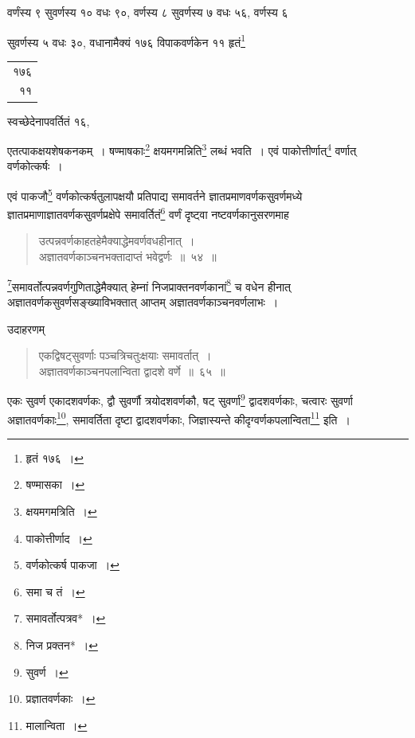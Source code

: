 \documentclass[10pt, openany]{book}
\begin{document}
{{{वर्णंस्य ९ सुवर्णस्य १० वधः ९०, वर्णस्य ८ सुवर्णस्य ७ वधः ५६, वर्णस्य
६}
{सुवर्णस्य ५ वधः ३०, वधानामैक्यं १७६ विपाकवर्णकेन ११ हृतं\renewcommand{\thefootnote}{\s १}\footnote{\s हृतं १७६~।}\begin{tabular}{r}१७६\\ ११\end{tabular}स्वच्छेदेनापवर्तितं १६,}
{एतत्पाकक्षयशेषकनकम्~। षण्माषकाः\renewcommand{\thefootnote}{\s २}\footnote{\s षण्मासका~।}  क्षयमगमन्निति\renewcommand{\thefootnote}{\s ३}\footnote{\s क्षयमगमत्रिति~।}  लब्धं भवति~।
एवं पाकोत्तीर्णात्\renewcommand{\thefootnote}{\s ४}\footnote{\s पाकोत्तीर्णाद~।} वर्णात् वर्णकोत्कर्षः~।}
\vspace{-1mm}

{एवं पाकजौ\renewcommand{\thefootnote}{\s ५}\footnote{\s  वर्णकोत्कर्ष पाकजा~।}  वर्णकोत्कर्षतुलापक्षयौ प्रतिपाद्य समावर्तने
ज्ञातप्रमाणवर्णकसुवर्णमध्ये}
{ज्ञातप्रमाणाज्ञातवर्णकसुवर्णप्रक्षेपे समावर्तितं\renewcommand{\thefootnote}{\s ६}\footnote{\s समा च तं~।}  वर्णं दृष्ट्वा
नष्टवर्णकानुसरणमाह\textemdash}

\begin{quote}
    
{\bs उत्पन्नवर्णकाहतहेमैक्याद्धेमवर्णवधहीनात्~। \\
 अज्ञातवर्णकाञ्चनभक्तादाप्तं भवेद्वर्णः~॥~५४~॥}\end{quote}

 {\renewcommand{\thefootnote}{\s ७}\footnote{\s समावर्तोत्पत्रव*~।}समावर्तोत्पन्नवर्णगुणिताद्धेमैक्यात् हेम्नां
निजप्राक्तनवर्णकानां\renewcommand{\thefootnote}{\s ८}\footnote{\s निज प्रक्तन*~।}  च वधेन हीनात् अज्ञातवर्णकसुवर्णसङ्ख्याविभक्तात् आप्तम् अज्ञातवर्णकाञ्चनवर्णलाभः~।}
\vspace{3mm}

{उदाहरणम्\textemdash}

\begin{quote}
    
{\eg एकद्विषट्सुवर्णाः पञ्चत्रिचतुःक्षयाः समावर्तात्~। \\
 अज्ञातवर्णकाञ्चनपलान्विता द्वादशे वर्णे~॥~६५~॥}\end{quote}

{एकः सुवर्ण एकादशवर्णकः, द्वौ सुवर्णौ त्रयोदशवर्णकौ, षट् सुवर्णा\renewcommand{\thefootnote}{\s ९}\footnote{\s सुवर्ण~।} 
द्वादशवर्णकाः,}
{चत्वारः सुवर्णा अज्ञातवर्णकाः\renewcommand{\thefootnote}{\s १०}\footnote{\s प्रज्ञातवर्णकाः~।}, समावर्तिता दृष्टा द्वादशवर्णकाः,
जिज्ञास्यन्ते कीदृग्वर्णकपलान्विता\renewcommand{\thefootnote}{\s ११}\footnote{\s मालान्विता~।}  इति~।}

}}
\end{document}
